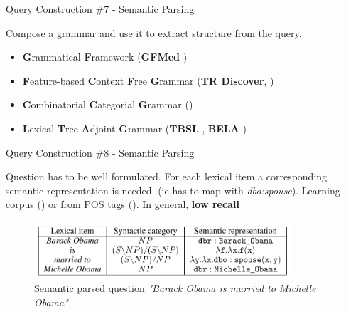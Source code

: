 \documentclass{beamer}
\begin{document}
\begin{frame}{Query Construction \#7 - Semantic Parsing}
  \begin{card}
    Compose a grammar and use it to extract structure from the query.
    \begin{itemize}
      \item \textbf{G}rammatical \textbf{F}ramework (\textbf{GFMed} \cite{marginean2017a})
      \item \textbf{F}eature-based \textbf{C}ontext \textbf{F}ree \textbf{G}rammar (\textbf{TR Discover}, \cite{song2015a})
      \item \textbf{C}ombinatorial \textbf{C}ategorial \textbf{G}rammar (\cite{hakimov2015a})
      \item \textbf{L}exical \textbf{T}ree \textbf{A}djoint \textbf{G}rammar (\textbf{TBSL} \cite{unger2012a}, \textbf{BELA} \cite{walter2012a})
    \end{itemize}
  \end{card}
\end{frame}

\note{}

\begin{frame}{Query Construction \#8 - Semantic Parsing}
  \begin{cardTiny}
    Question has to be well formulated. For each lexical item a corresponding semantic representation is needed. (ie  has to map with \textit{dbo:spouse}). Learning corpus (\cite{hakimov2015a}) or from POS tags (\cite{unger2012a}). In general, \textbf{low recall}
  \end{cardTiny}
  \begin{cardTiny}
    \begin{figure}\label{fig:semantic_query}
      \centering
      \includegraphics[width=0.85\textwidth]{./res/semantic_query.png}
      \caption{Semantic parsed question \textit{"Barack Obama is married to Michelle Obama"}}
    \end{figure}
  \end{cardTiny}
\end{frame}

\note{}
\end{document}
